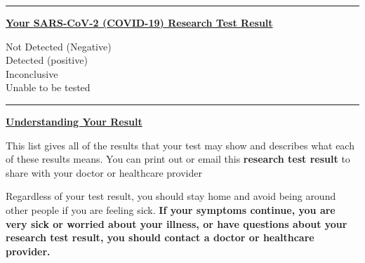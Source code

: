 \documentclass[10pt]{article}
\newcommand{\PageLine}{\rule{\textwidth}{0.25mm}}
\begin{document}
\bigskip
\PageLine

\large \underline{\textbf{Your SARS-CoV-2 (COVID-19) Research Test Result}}

Not Detected (Negative)\\
Detected (positive)\\
Inconclusive\\
Unable to be tested\\

\PageLine
\bigskip

\large \underline{\textbf{Understanding Your Result}}

This list gives all of the results that your test may show and describes what
each of these results means. You can print out or email this \textbf{research
test result} to share with your doctor or healthcare provider

Regardless of your test result, you should stay home and avoid being around
other people if you are feeling sick. \textbf{If your symptoms continue, you are
very sick or worried about your illness, or have questions about your research
test result, you should contact a doctor or healthcare provider.}
\end{document}
